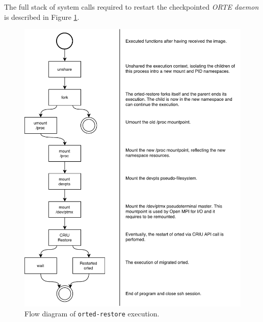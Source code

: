 The full stack of system calls required to restart the checkpointed
\emph{ORTE daemon} is described in Figure \ref{fig:cap4-unshare}.

\begin{figure}[t]
		\centerline 
{\includegraphics[scale=0.7]{img/cap4-unshare.pdf}}
		\caption[The \texttt{orted-restore} flow diagram]{Flow diagram of \texttt{orted-restore} execution.}
		\label{fig:cap4-unshare}
\end{figure}
